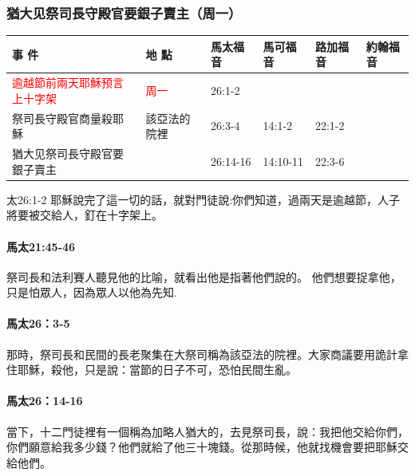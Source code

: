 \subsubsection{猶大见祭司長守殿官要銀子賣主（周一）}
\begin{table}[H] \centering
\begin{tabular}{p{14em}|p{7.93em}|l|l|l|p{4.855em}} \toprule
\textbf{事 件} & \textbf{地 點} & \multicolumn{1}{p{5.285em}|}{\textbf{馬太福音}} & \multicolumn{1}{p{5.57em}|}{\textbf{馬可福音}} & \multicolumn{1}{p{5.285em}|}{\textbf{路加福音}} & \textbf{約翰福音} \\  \midrule
\textcolor{red}{逾越節前兩天耶穌预言上十字架}&\textcolor{red}{周一}& 26:1-2&       &&  \\\midrule
祭司長守殿官商量殺耶穌&該亞法的院裡& 26:3-4&14:1-2&22:1-2&  \\\midrule
猶大见祭司長守殿官要銀子賣主& &26:14-16&14:10-11 &22:3-6&  \\\midrule
\end{tabular}%
\end{table}
太26:1-2 耶穌說完了這一切的話，就對門徒說:你們知道，過兩天是逾越節，人子將要被交給人，釘在十字架上。


\paragraph{馬太21:45-46}
祭司長和法利賽人聽見他的比喻，就看出他是指著他們說的。
他們想要捉拿他，只是怕眾人，因為眾人以他為先知.
\paragraph{馬太26：3-5}
那時，祭司長和民間的長老聚集在大祭司稱為該亞法的院裡。大家商議要用詭計拿住耶穌，殺他，只是說：當節的日子不可，恐怕民間生亂。%
\paragraph{馬太26：14-16}
當下，十二門徒裡有一個稱為加略人猶大的，去見祭司長，說：我把他交給你們，你們願意給我多少錢？他們就給了他三十塊錢。從那時候，他就找機會要把耶穌交給他們。%

